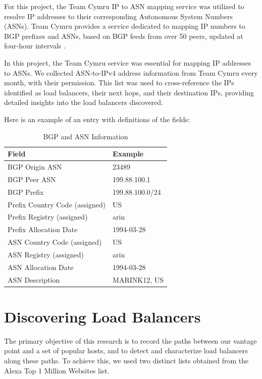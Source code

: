\documentclass[12pt]{cwru_thesis}
\begin{document}
For this project, the Team Cymru IP to ASN mapping service was utilized to resolve IP addresses to their corresponding Autonomous System Numbers (ASNs). Team Cymru provides a service dedicated to mapping IP numbers to BGP prefixes and ASNs, based on BGP feeds from over 50 peers, updated at four-hour intervals \cite{Cymru}.

In this project, the Team Cymru service was essential for mapping IP addresses to ASNs. We collected ASN-to-IPv4 address information from Team Cymru every month, with their permission. This list was used to cross-reference the IPs identified as load balancers, their next hops, and their destination IPs, providing detailed insights into the load balancers discovered.

Here is an example of an entry with definitions of the fields:
\begin{table}[h]
    \centering
    \begin{tabular}{|l|l|}
        \hline
        \textbf{Field} & \textbf{Example} \\
        \hline
        BGP Origin ASN & 23489 \\
        \hline
        BGP Peer ASN & 199.88.100.1 \\
        \hline
        BGP Prefix & 199.88.100.0/24 \\
        \hline
        Prefix Country Code (assigned) & US \\
        \hline
        Prefix Registry (assigned) & arin \\
        \hline
        Prefix Allocation Date & 1994-03-28 \\
        \hline
        ASN Country Code (assigned) & US \\
        \hline
        ASN Registry (assigned) & arin \\
        \hline
        ASN Allocation Date & 1994-03-28 \\
        \hline
        ASN Description & MARINK12, US \\
        \hline
    \end{tabular}
    \caption{BGP and ASN Information}
    \label{tab:bgp_asn_info}
\end{table}

\section{Discovering Load Balancers}

The primary objective of this research is to record the paths between our vantage point and a set of popular hosts, and to detect and characterize load balancers along these paths. To achieve this, we used two distinct lists obtained from the Alexa Top 1 Million Websites list.
\end{document}
